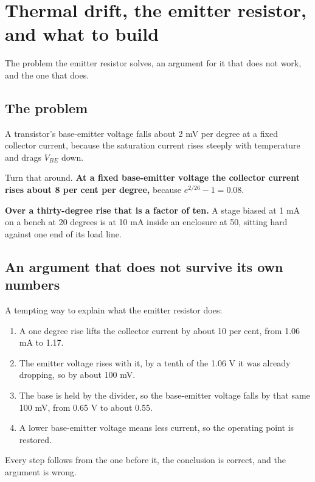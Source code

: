 
\section{Thermal drift, the emitter resistor, and what to build}
\label{c6:app:b}

The problem the emitter resistor solves, an argument for it that does not work, and the one that does.

\subsection{The problem}
\label{c6:sec:b1}
A transistor's base-emitter voltage falls about 2 mV per degree at a fixed collector current, because the saturation current rises steeply with temperature and drags $V_{BE}$ down.

Turn that around. \textbf{At a fixed base-emitter voltage the collector current rises about 8 per cent per degree,} because $e^{2/26} - 1 = 0.08$.


\textbf{Over a thirty-degree rise that is a factor of ten.} A stage biased at 1 mA on a bench at 20 degrees is at 10 mA inside an enclosure at 50, sitting hard against one end of its load line.

\subsection{An argument that does not survive its own numbers}
\label{c6:sec:b2}
A tempting way to explain what the emitter resistor does:

\begin{enumerate}
  \item A one degree rise lifts the collector current by about 10 per cent, from 1.06 mA to 1.17.
  \item The emitter voltage rises with it, by a tenth of the 1.06 V it was already dropping, so by about 100 mV.
  \item The base is held by the divider, so the base-emitter voltage falls by that same 100 mV, from 0.65 V to about 0.55.
  \item A lower base-emitter voltage means less current, so the operating point is restored.
\end{enumerate}
Every step follows from the one before it, the conclusion is correct, and the argument is wrong.

